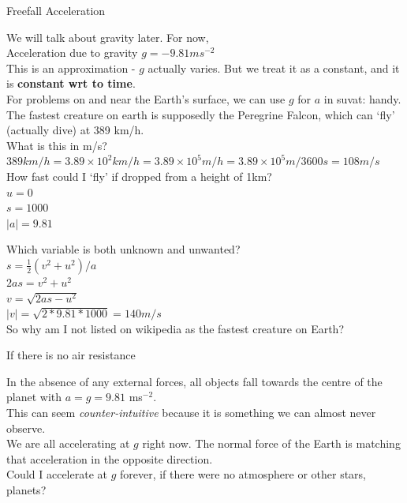 \begin{frame}{Freefall Acceleration}

We will talk about gravity later. For now, \\

Acceleration due to gravity $g = -9.81 ms^{-2}$\\

This is an approximation - $g$ actually varies. But we treat it as a constant, and it is \textbf{constant wrt to time}.\\

For problems on and near the Earth's surface, we can use $g$ for $a$ in suvat: handy.\\

The fastest creature on earth is supposedly the Peregrine Falcon, which can `fly' (actually dive) at 389 km/h.\\

What is this in m/s?\\

$389 km/h = 3.89\times10^2 km/h = 3.89\times10^5 m/h = 3.89\times10^5 m / 3600 s =108 m/s $\\

How fast could I `fly' if dropped from a height of 1km?\\

$u = 0$\\
$s = 1000$\\
$|a| = 9.81$

Which variable is both unknown and unwanted?\\

$s =  \frac{1}{2} (v^2 +u^2)/a$\\
$2as =  v^2 +u^2$\\
$v = \sqrt{2as - u^2}$\\
$|v| = \sqrt{2*9.81*1000} = 140 m/s$\\

So why am I not listed on wikipedia as the fastest creature on Earth?


\end{frame}


\begin{frame}{If there is no air resistance}

In the absence of any external forces, all objects fall towards the centre of the planet with $a = g =9.81$ ms$^{-2}$.\\

This can seem \textit{counter-intuitive} because it is something we can almost never observe.\\

We are all accelerating at $g$ right now. The normal force of the Earth is matching that acceleration in the opposite direction.\\

Could I accelerate at $g$ forever, if there were no atmosphere or other stars, planets?\\


\end{frame}



